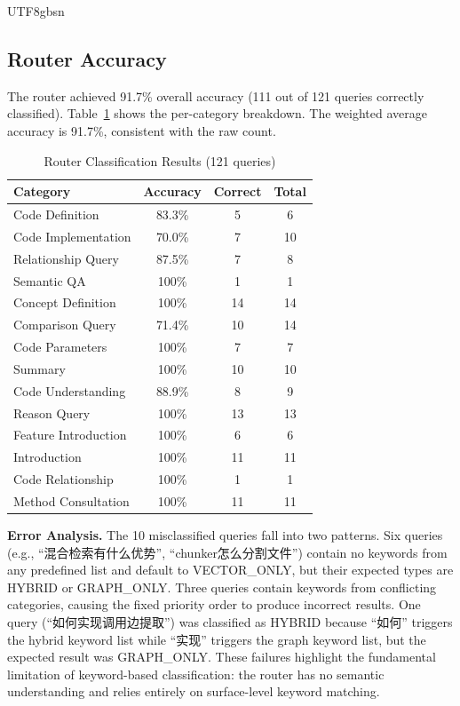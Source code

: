 \documentclass[11pt]{article}
\begin{document}
\begin{CJK*}{UTF8}{gbsn}
\subsection{Router Accuracy}
The router achieved 91.7\% overall accuracy (111 out of 121 queries correctly classified). Table~\ref{tab:router_results} shows the per-category breakdown. The weighted average accuracy is 91.7\%, consistent with the raw count.

\begin{table}[htbp]
\centering
\caption{Router Classification Results (121 queries)}
\label{tab:router_results}
\begin{tabular}{lccc}
\toprule
Category & Accuracy & Correct & Total \\
\midrule
Code Definition & 83.3\% & 5 & 6 \\
Code Implementation & 70.0\% & 7 & 10 \\
Relationship Query & 87.5\% & 7 & 8 \\
Semantic QA & 100\% & 1 & 1 \\
Concept Definition & 100\% & 14 & 14 \\
Comparison Query & 71.4\% & 10 & 14 \\
Code Parameters & 100\% & 7 & 7 \\
Summary & 100\% & 10 & 10 \\
Code Understanding & 88.9\% & 8 & 9 \\
Reason Query & 100\% & 13 & 13 \\
Feature Introduction & 100\% & 6 & 6 \\
Introduction & 100\% & 11 & 11 \\
Code Relationship & 100\% & 1 & 1 \\
Method Consultation & 100\% & 11 & 11 \\
\bottomrule
\end{tabular}
\end{table}

\textbf{Error Analysis.} The 10 misclassified queries fall into two patterns. Six queries (e.g., ``混合检索有什么优势'', ``chunker怎么分割文件'') contain no keywords from any predefined list and default to VECTOR\_ONLY, but their expected types are HYBRID or GRAPH\_ONLY. Three queries contain keywords from conflicting categories, causing the fixed priority order to produce incorrect results. One query (``如何实现调用边提取'') was classified as HYBRID because ``如何'' triggers the hybrid keyword list while ``实现'' triggers the graph keyword list, but the expected result was GRAPH\_ONLY. These failures highlight the fundamental limitation of keyword-based classification: the router has no semantic understanding and relies entirely on surface-level keyword matching.


\end{CJK*}
\end{document}
